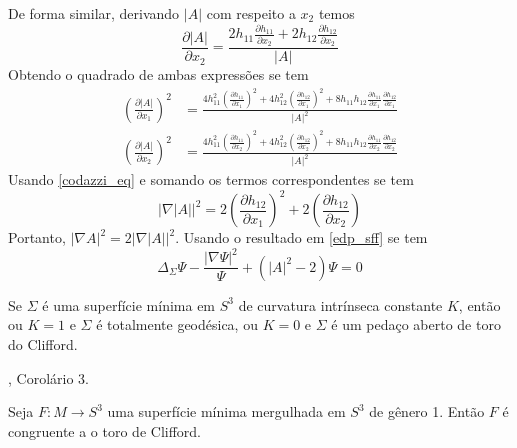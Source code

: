 \begin{demonstracao}
\begin{equation*}
	\end{equation*}	
	De forma similar, derivando $ |A| $ com respeito a $ x_2 $ temos
	\begin{equation*}
		\frac{\partial |A|}{\partial x_2} = \frac{2 h_{11} \frac{\partial h_{11}}{\partial x_2} + 2 h_{12} \frac{\partial h_{12}}{\partial x_2}}{|A|}
	\end{equation*}	
	Obtendo o quadrado de ambas expressões se tem
	\begin{align*}
		\left( \frac{\partial |A|}{\partial x_1} \right)^2 &= \frac{4 h_{11}^2 \left( \frac{\partial h_{11}}{\partial x_1} \right)^2 + 4 h_{12}^2 \left( \frac{\partial h_{12}}{\partial x_1} \right)^2 + 8 h_{11} h_{12} \frac{\partial h_{11}}{\partial x_1} \frac{\partial h_{12}}{\partial x_1}}{|A|^2}\\
		\left( \frac{\partial |A|}{\partial x_2} \right)^2 &= \frac{4 h_{11}^2 \left( \frac{\partial h_{11}}{\partial x_2} \right)^2 + 4 h_{12}^2 \left( \frac{\partial h_{12}}{\partial x_2} \right)^2 + 8 h_{11} h_{12} \frac{\partial h_{11}}{\partial x_2} \frac{\partial h_{12}}{\partial x_2}}{|A|^2}
	\end{align*}	
	Usando \eqref{codazzi_eq} e somando os termos correspondentes se tem
	\begin{equation*}
		| \nabla |A| |^2 = 2 \left( \frac{\partial h_{12}}{\partial x_1} \right)^2 + 2 \left( \frac{\partial h_{12}}{\partial x_2} \right)
	\end{equation*}	
	Portanto, $ | \nabla A |^2 = 2 | \nabla |A| |^2 $. Usando o resultado em \ref{edp_sff} se tem
	\begin{equation*}
		\Delta_\Sigma \Psi - \frac{|\nabla \Psi|^2}{\Psi} + (|A|^2 - 2) \Psi = 0
	\end{equation*}
\end{demonstracao}


\begin{teorema}[Lawson]\label{teo_lawson}
	Se $\Sigma$ é uma superfície mínima em $S^3$ de curvatura intrínseca constante $K$, então ou $K=1$ e $\Sigma$ é totalmente geodésica, ou $K=0$ e $\Sigma$ é um pedaço aberto de toro do Clifford.
\end{teorema}

\begin{demonstracao}
	\cite{Lawson1969}, Corolário 3.
\end{demonstracao}

\begin{teorema}[Brendle]
	Seja $F: M \rightarrow S^3$ uma superfície mínima mergulhada em $S^3$ de gênero 1. Então $F$ é congruente a o toro de Clifford.
\end{teorema}


